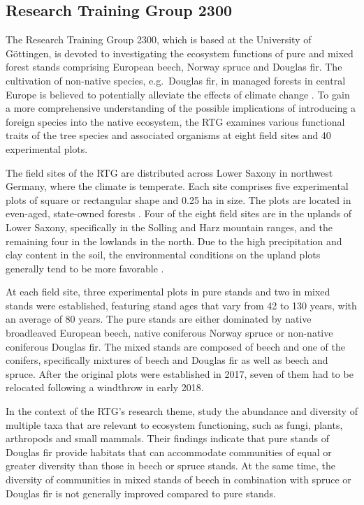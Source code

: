 \documentclass{article}
\begin{document}
\subsection{Research Training Group 2300}

The Research Training Group 2300, which is based at the University of Göttingen, is devoted to investigating the ecosystem functions of pure and mixed forest stands comprising European beech, Norway spruce and Douglas fir. The cultivation of non-native species, e.g.~Douglas fir, in managed forests in central Europe is believed to potentially alleviate the effects of climate change \citep{glatthornSpecies2023}. To gain a more comprehensive understanding of the possible implications of introducing a foreign species into the native ecosystem, the RTG examines various functional traits of the tree species and associated organisms at eight field sites and 40 experimental plots.

The field sites of the RTG are distributed across Lower Saxony in northwest Germany, where the climate is temperate. Each site comprises five experimental plots of square or rectangular shape and 0.25 ha in size. The plots are located in even-aged, state-owned forests \citep{ammerRTG2020}. Four of the eight field sites are in the uplands of Lower Saxony, specifically in the Solling and Harz mountain ranges, and the remaining four in the lowlands in the north. Due to the high precipitation and clay content in the soil, the environmental conditions on the upland plots generally tend to be more favorable \citep{foltranDouglas2022}.

At each field site, three experimental plots in pure stands and two in mixed stands were established, featuring stand ages that vary from 42 to 130 years, with an average of 80 years. The pure stands are either dominated by native broadleaved European beech, native coniferous Norway spruce or non-native coniferous Douglas fir. The mixed stands are composed of beech and one of the conifers, specifically mixtures of beech and Douglas fir as well as beech and spruce. After the original plots were established in 2017, seven of them had to be relocated following a windthrow in early 2018.

In the context of the RTG's research theme, \citet{glatthornSpecies2023} study the abundance and diversity of multiple taxa that are relevant to ecosystem functioning, such as fungi, plants, arthropods and small mammals. Their findings indicate that pure stands of Douglas fir provide habitats that can accommodate communities of equal or greater diversity than those in beech or spruce stands. At the same time, the diversity of communities in mixed stands of beech in combination with spruce or Douglas fir is not generally improved compared to pure stands.
\end{document}
